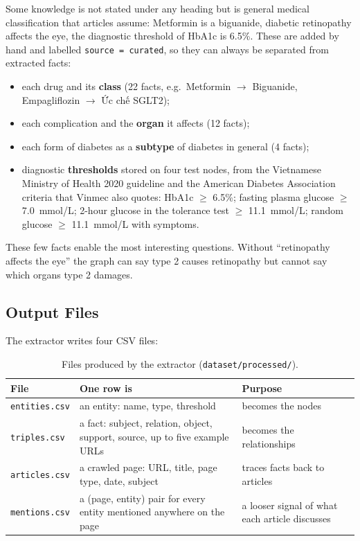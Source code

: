 \documentclass[11pt, a4paper]{article}
\newcommand{\code}[1]{\texttt{#1}}
\begin{document}
Some knowledge is not stated under any heading but is general medical classification that articles assume: Metformin is a biguanide, diabetic retinopathy affects the eye, the diagnostic threshold of HbA1c is 6.5\%. These are added by hand and labelled \code{source = curated}, so they can always be separated from extracted facts:
\begin{itemize}
    \item each drug and its \textbf{class} (22 facts, e.g.\ Metformin $\rightarrow$ Biguanide, Empagliflozin $\rightarrow$ Ức chế SGLT2);
    \item each complication and the \textbf{organ} it affects (12 facts);
    \item each form of diabetes as a \textbf{subtype} of diabetes in general (4 facts);
    \item diagnostic \textbf{thresholds} stored on four test nodes, from the Vietnamese Ministry of Health 2020 guideline and the American Diabetes Association criteria that Vinmec also quotes: HbA1c $\geq$ 6.5\%; fasting plasma glucose $\geq$ 7.0~mmol/L; 2-hour glucose in the tolerance test $\geq$ 11.1~mmol/L; random glucose $\geq$ 11.1~mmol/L with symptoms.
\end{itemize}
These few facts enable the most interesting questions. Without ``retinopathy affects the eye'' the graph can say type 2 causes retinopathy but cannot say which organs type 2 damages.

\subsection{Output Files}
\label{sec:outputs}

The extractor writes four CSV files:

\begin{table}[H]
\centering
\small
\caption{Files produced by the extractor (\code{dataset/processed/}).}
\begin{tabularx}{\textwidth}{l X X}
\toprule
File & One row is & Purpose \\
\midrule
\code{entities.csv} & an entity: name, type, threshold & becomes the nodes \\
\code{triples.csv} & a fact: subject, relation, object, support, source, up to five example URLs & becomes the relationships \\
\code{articles.csv} & a crawled page: URL, title, page type, date, subject & traces facts back to articles \\
\code{mentions.csv} & a (page, entity) pair for every entity mentioned anywhere on the page & a looser signal of what each article discusses \\
\bottomrule
\end{tabularx}
\end{table}
\end{document}
